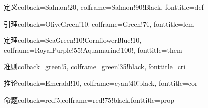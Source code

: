 \usepackage{tcolorbox}


    {定义}{colback=Salmon!20, colframe=Salmon!90!Black, fonttitle=\bfseries}{def}

    {引理}{colback=OliveGreen!10, colframe=Green!70, fonttitle=\bfseries}{lem}

    {定理}{colback=SeaGreen!10!CornflowerBlue!10, 
           colframe=RoyalPurple!55!Aquamarine!100!,
           fonttitle=\bfseries}{them}

    {准则}{colback=green!5, colframe=green!35!black, fonttitle=\bfseries}{cri}

    {推论}{colback=Emerald!10, colframe=cyan!40!black, fonttitle=\bfseries}{cor}

    {命题}{colback=red!5,colframe=red!75!black,fonttitle=\bfseries}{prop}

\newtheorem{example}{\indent \color{SeaGreen}{例}}[section]
\theoremstyle{plain}
\newtheorem*{rmk}{\indent 注}
\renewenvironment{proof}{\indent\textcolor{SkyBlue}{\textbf{证明:}}\;}{\qed\par}
\newenvironment{solution}{\indent\textcolor{SkyBlue}{\textbf{解:}}\;}{\qed\par}